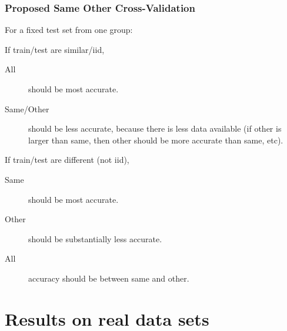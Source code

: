\documentclass{beamer}
\begin{document}
\begin{frame}
  \frametitle{Proposed Same Other Cross-Validation}
  For a fixed test set from one group:
  
  If train/test are similar/iid,
  \begin{description}
  \item[All] should be most accurate.
  \item[Same/Other] should be less accurate, because there is less
    data available (if other is larger than same, then other should be
    more accurate than same, etc).
  \end{description}

  If train/test are different (not iid),
  \begin{description}
  \item[Same] should be most accurate.
  \item[Other] should be substantially less accurate.
  \item[All] accuracy should be between same and other.
  \end{description}
\end{frame}

\section{Results on real data sets}
\end{document}
